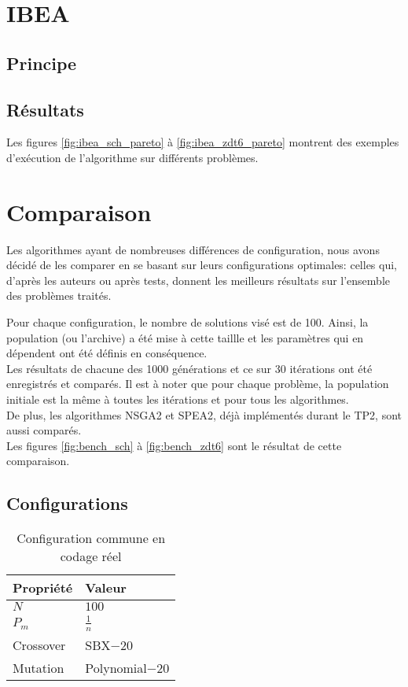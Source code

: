 \documentclass[12pt]{article}
\begin{document}
\section{IBEA}

\subsection{Principe}

\subsection{Résultats}
Les figures \ref{fig:ibea_sch_pareto} à \ref{fig:ibea_zdt6_pareto}
montrent des exemples d'exécution de l'algorithme sur différents
problèmes.


\section{Comparaison}

Les algorithmes ayant de nombreuses différences de configuration, nous
avons décidé de les comparer en se basant sur leurs configurations
optimales: celles qui, d'après les auteurs ou après tests, donnent les
meilleurs résultats sur l'ensemble des problèmes traités.

Pour chaque configuration, le nombre de solutions visé est de
100. Ainsi, la population (ou l'archive) a été mise à cette taillle et
les paramètres qui en dépendent ont été définis en conséquence.\\

Les résultats de chacune des 1000 générations et ce sur 30 itérations
ont été enregistrés et comparés. Il est à noter que pour chaque
problème, la population initiale est la même à toutes les itérations
et pour tous les algorithmes.\\

De plus, les algorithmes NSGA2 et SPEA2, déjà implémentés durant le
TP2, sont aussi comparés.\\

Les figures \ref{fig:bench_sch} à \ref{fig:bench_zdt6} sont le
résultat de cette comparaison.

\FloatBarrier

\subsection{Configurations}

\begin{table}[ht]
  \centering
  \begin{tabular}{|l|l|}
    \hline
    \textbf{Propriété} & \textbf{Valeur}\\
    \hline
    $N$ & $100$  \\
    \hline
    $P_m$ & $\frac{1}{n}$  \\
    \hline
    Crossover & SBX$-20$ \\
    \hline
    Mutation & Polynomial$-20$ \\
    \hline
  \end{tabular}
  \caption{Configuration commune en codage réel} 
\end{table}
\end{document}
